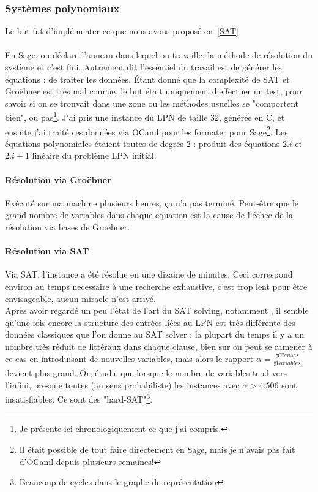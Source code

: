 \documentclass{article}		%
\theoremstyle{definition}
\theoremstyle{plain}
\theoremstyle{plain}
\theoremstyle{plain}
\theoremstyle{plain}
\begin{document}
\subsubsection{Systèmes polynomiaux}\label{ISAT}
Le but fut d'implémenter ce que nous avons proposé en~\ref{SAT}
\\\\
En Sage, on déclare l'anneau dans lequel on travaille, la méthode de
résolution du système et c'est fini. Autrement dit l'essentiel du travail
est de générer les équations : de traiter les données. Étant donné que la
complexité de SAT et Groëbner est très mal connue, le but était
uniquement d'effectuer un test, pour savoir si on se trouvait dans une
zone ou les méthodes usuelles se "comportent bien", ou pas\footnote{Je
présente ici chronologiquement ce que j'ai compris.}.
J'ai pris une instance du LPN de taille 32, générée en C, et ensuite j'ai
traité ces données via OCaml pour les formater pour Sage\footnote{Il
était possible de tout faire directement en Sage, mais je n'avais pas
fait d'OCaml depuis plusieurs semaines!}. Les équations polynomiales
étaient toutes de degrés 2 : produit des équations $2.i$ et $2.i+1$
linéaire du problème LPN initial.
\paragraph{Résolution via Groëbner}
Exécuté sur ma machine plusieurs heures, ça n'a pas terminé. Peut-être 
que le grand nombre de variables dans chaque équation est la cause de
l'échec de la résolution via
bases de Groëbner.
\paragraph{Résolution via SAT}
Via SAT, l'instance a été résolue en une dizaine de minutes. Ceci
correspond environ au temps necessaire à une recherche exhaustive, c'est
trop lent pour être envisageable, aucun miracle n'est arrivé. 
\\
Après avoir regardé
un peu l'état de l'art du SAT solving, notamment \cite{Mezard}, il semble qu'une fois encore la
structure des entrées liées au LPN est très différente des données
classiques que l'on donne au SAT solver : la plupart du temps il y a un
nombre très réduit de littéraux dans chaque clause, bien sur on peut se
ramener à ce cas en introduisant de nouvelles variables, mais alors le
rapport $\alpha=\frac {\sharp Clauses}{\sharp Variables}$ devient plus grand.
Or, \cite{Dubois} étudie que lorsque le nombre de variables tend vers
l'infini, presque toutes (au sens probabiliste) les
instances avec $\alpha > 4.506$ sont insatisfiables. Ce sont des
"hard-SAT"\footnote{Beaucoup de cycles dans le graphe de représentation}.
\end{document}
